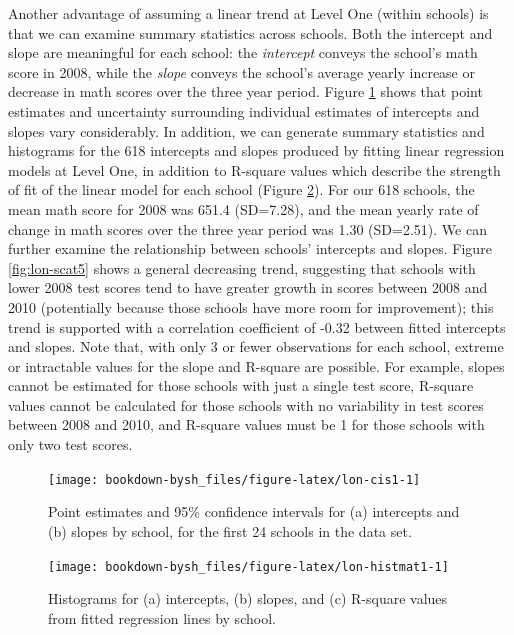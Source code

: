 \documentclass[
]{krantz}
\begin{document}
Another advantage of assuming a linear trend at Level One (within schools) is that we can examine summary statistics across schools. Both the intercept and slope are meaningful for each school: the \emph{intercept} conveys the school's math score in 2008, while the \emph{slope} conveys the school's average yearly increase or decrease in math scores over the three year period. Figure \ref{fig:lon-cis1} shows that point estimates and uncertainty surrounding individual estimates of intercepts and slopes vary considerably. In addition, we can generate summary statistics and histograms for the 618 intercepts and slopes produced by fitting linear regression models at Level One, in addition to R-square values which describe the strength of fit of the linear model for each school (Figure \ref{fig:lon-histmat1}). For our 618 schools, the mean math score for 2008 was 651.4 (SD=7.28), and the mean yearly rate of change in math scores over the three year period was 1.30 (SD=2.51). We can further examine the relationship between schools' intercepts and slopes. Figure \ref{fig:lon-scat5} shows a general decreasing trend, suggesting that schools with lower 2008 test scores tend to have greater growth in scores between 2008 and 2010 (potentially because those schools have more room for improvement); this trend is supported with a correlation coefficient of -0.32 between fitted intercepts and slopes. Note that, with only 3 or fewer observations for each school, extreme or intractable values for the slope and R-square are possible. For example, slopes cannot be estimated for those schools with just a single test score, R-square values cannot be calculated for those schools with no variability in test scores between 2008 and 2010, and R-square values must be 1 for those schools with only two test scores.



\begin{figure}

{\centering \texttt{[image: bookdown-bysh\_files/figure-latex/lon-cis1-1]} 

}

\caption{Point estimates and 95\% confidence intervals for (a) intercepts and (b) slopes by school, for the first 24 schools in the data set.}\label{fig:lon-cis1}
\end{figure}

\begin{figure}

{\centering \texttt{[image: bookdown-bysh\_files/figure-latex/lon-histmat1-1]} 

}

\caption{ Histograms for (a) intercepts, (b) slopes, and (c) R-square values from fitted regression lines by school.}\label{fig:lon-histmat1}
\end{figure}
\end{document}
